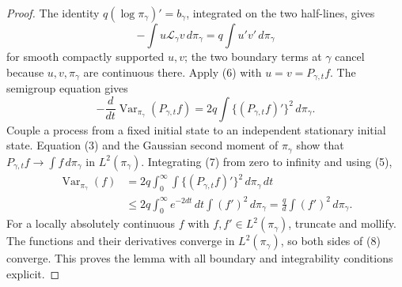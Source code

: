 \documentclass{article}
\begin{document}
\begin{proof}
The identity \(q(\log\pi_\gamma)'=b_\gamma\), integrated on the two half-lines, gives
\[
 -\int u\mathcal L_\gamma v\,d\pi_\gamma
 =q\int u'v'\,d\pi_\gamma                                  \tag{6}
\]
for smooth compactly supported \(u,v\); the two boundary terms at \(\gamma\) cancel because \(u,v,\pi_\gamma\) are continuous there.  Apply (6) with \(u=v=P_{\gamma,t}f\).  The semigroup equation gives
\[
 -\frac{d}{dt}\operatorname{Var}_{\pi_\gamma}(P_{\gamma,t}f)
 =2q\int\{(P_{\gamma,t}f)'\}^2\,d\pi_\gamma.                \tag{7}
\]
Couple a process from a fixed initial state to an independent stationary initial state.  Equation (3) and the Gaussian second moment of \(\pi_\gamma\) show that \(P_{\gamma,t}f\to\int f\,d\pi_\gamma\) in \(L^2(\pi_\gamma)\).  Integrating (7) from zero to infinity and using (5),
\[
 \begin{split}
 \operatorname{Var}_{\pi_\gamma}(f)
 &=2q\int_0^\infty\int\{(P_{\gamma,t}f)'\}^2\,d\pi_\gamma\,dt\\
 &\leq2q\int_0^\infty e^{-2dt}\,dt\int(f')^2\,d\pi_\gamma
 =\frac qd\int(f')^2\,d\pi_\gamma.                           \tag{8}
 \end{split}
\]
For a locally absolutely continuous \(f\) with \(f,f'\in L^2(\pi_\gamma)\), truncate and mollify.  The functions and their derivatives converge in \(L^2(\pi_\gamma)\), so both sides of (8) converge.  This proves the lemma with all boundary and integrability conditions explicit.
\end{proof}
\end{document}
